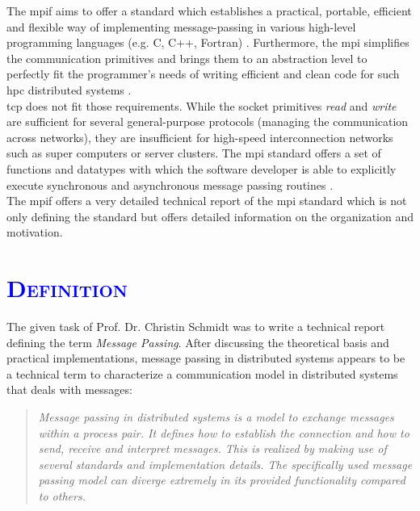 \documentclass[xcolor=dvipsnames]{article}
\begin{document}
\noindent The \gls{mpif} aims to offer a standard which establishes a practical, portable, efficient and flexible way of implementing message-passing in various high-level programming languages (e.g. C, C++, Fortran) \cite[ch. History/iii]{mpi}. Furthermore, the \gls{mpi} simplifies the communication primitives and brings them to an abstraction level to perfectly fit the programmer's needs of writing efficient and clean code for such \gls{hpc} distributed systems \cite[ch. 4.3.1 on p 143]{tanenbaum}.\\

\noindent \gls{tcp} does not fit those requirements. While the socket primitives \textit{read} and \textit{write} are sufficient for several general-purpose protocols (managing the communication across networks), they are insufficient for high-speed interconnection networks such as super computers or server clusters. The \gls{mpi} standard offers a set of functions and datatypes with which the software developer is able to explicitly execute synchronous and asynchronous message passing routines \cite[ch. 4.3 on p. 143]{tanenbaum}.\\

\noindent The \gls{mpif} offers a very detailed technical report \cite{mpi} of the \gls{mpi} standard which is not only defining the standard but offers detailed information on the organization and motivation.

\section{\scshape{\textcolor{blue}{Definition}}}

The given task of Prof. Dr. Christin Schmidt was to write a technical report defining the term \textit{Message Passing}. After discussing the theoretical basis and practical implementations, message passing in distributed systems appears to be a technical term to characterize a communication model in distributed systems that deals with messages:

\begin{quote}
\textit{Message passing in distributed systems is a model to exchange messages within a process pair. It defines how to establish the connection and how to send, receive and interpret messages. This is realized by making use of several standards and implementation details. The specifically used message passing model can diverge extremely in its provided functionality compared to others.}
\end{quote}
\end{document}
